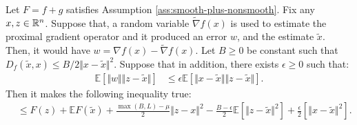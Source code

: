 \documentclass[12pt]{article}
\newcommand{\expect}{\ensuremath{\mathbb E}}
\begin{document}
        \begin{lemma}\label{lemma:stoch-pg-ineq}
            Let $F = f + g$ satisfies Assumption \ref{ass:smooth-plus-nonsmooth}. 
            Fix any $x, z \in \mathbb R^n$. 
            Suppose that, a random variable $\tilde \nabla f(x)$ is used to estimate the proximal gradient operator and it produced an error $w$, and the estimate $\tilde x$. 
            Then, it would have $w = \nabla f(x) - \tilde \nabla f(x)$. 
            Let $B \ge 0$ be constant such that $D_f(\tilde x,x)\le B/2 \Vert x - \tilde x\Vert^2$. 
            Suppose that in addition, there exists $\epsilon \ge 0$ such that: 
            \begin{align*}
                \expect \left[
                    \Vert w\Vert \Vert z - \tilde x\Vert
                \right] &\le \epsilon \expect \left[
                    \Vert x - \tilde x\Vert\Vert z - \tilde x\Vert
                \right]. 
            \end{align*}
            Then it makes the following inequality true: 
            \begin{align*}
                &\le 
                F(z) + \expect F(\tilde x) + \frac{\max(B, L) - \mu}{2} \Vert z - x\Vert^2
                - \frac{B - \epsilon}{2}\expect\left[\Vert z - \tilde x\Vert^2\right]
                + \frac{\epsilon}{2} \left[\Vert x - \tilde x\Vert^2\right]. 
            \end{align*}
        \end{lemma}
\end{document}
